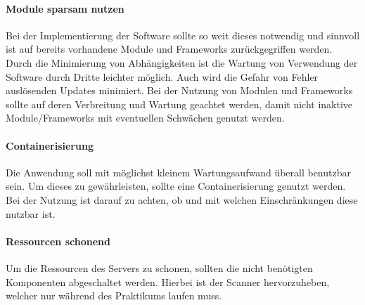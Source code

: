 \paragraph{Module sparsam nutzen}
Bei der Implementierung der Software sollte so weit dieses notwendig und sinnvoll ist auf bereits vorhandene Module und Frameworks zurückgegriffen werden. Durch die Minimierung von Abhängigkeiten ist die Wartung von Verwendung der Software durch Dritte leichter möglich. Auch wird die Gefahr von Fehler auslösenden Updates minimiert. Bei der Nutzung von Modulen und Frameworks sollte auf deren Verbreitung und Wartung geachtet werden, damit nicht inaktive Module/Frameworks mit eventuellen Schwächen genutzt werden.

\paragraph{Containerisierung}
Die Anwendung soll mit möglichst kleinem Wartungsaufwand überall benutzbar sein. Um dieses zu gewährleisten, sollte eine Containerisierung genutzt werden. Bei der Nutzung ist darauf zu achten, ob und mit welchen Einschränkungen diese nutzbar ist.

\paragraph{Ressourcen schonend}
Um die Ressourcen des Servers zu schonen, sollten die nicht benötigten Komponenten abgeschaltet werden. Hierbei ist der Scanner hervorzuheben, welcher nur während des Praktikums laufen muss. 